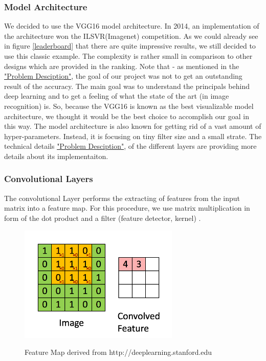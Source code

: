 \documentclass[journal]{IEEEtran}
\begin{document}
\subsubsection{Model Architecture}
We decided to use the VGG16 model architecture. In 2014, an implementation of the architecture won the ILSVR(Imagenet) competition. As we could already see in figure \ref{leaderboard} that there are quite impressive results, we still decided to use this classic example. The complexity is rather small in comparison to other designs which are provided in the ranking. Note that - as  mentioned in the \hyperref[sec:problemDescription]{"Problem Desciption"}, the goal of our project was not to get an outstanding result of the accuracy. The main goal was  to understand the principals behind deep learning and to get a feeling of what the state of the art (in image recognition) is. So, because the VGG16 is known as the best visualizable model architecture, we thought it would be the best choice to accomplish our goal in this way. The model architecture is also known for getting rid of a vast amount of hyper-parameters. Instead, it is focusing on tiny filter size and a small strate. The technical details \hyperref[sec:techDetails]{"Problem Desciption"}, of the different layers are providing more details about its implementaiton. 
\subsubsection{Convolutional Layers}
\noindent The convolutional Layer performs the extracting of features from the input matrix into a feature map. For this procedure, we use matrix multiplication in form of the dot product and a filter (feature detector, kernel) \cite{Goodfellow-et-al-2016}. 

\begin{figure}
  \begin{center}
  \includegraphics[width=3in]{photo/cnn.png}\\
  \caption{Feature Map derived from http://deeplearning.stanford.edu}\label{featuremap}
  \end{center}
\end{figure}
\end{document}
